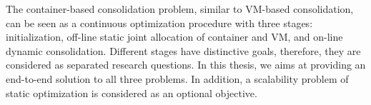 

The container-based consolidation problem, similar to VM-based consolidation, can be seen as 
a continuous optimization procedure with three stages: initialization, off-line static joint allocation of container and VM, and on-line dynamic consolidation. Different stages have distinctive goals, therefore, they are considered as separated research questions. In this thesis, we aims at providing an end-to-end solution to all three problems. In addition, a scalability problem of static optimization is considered as an optional objective.

